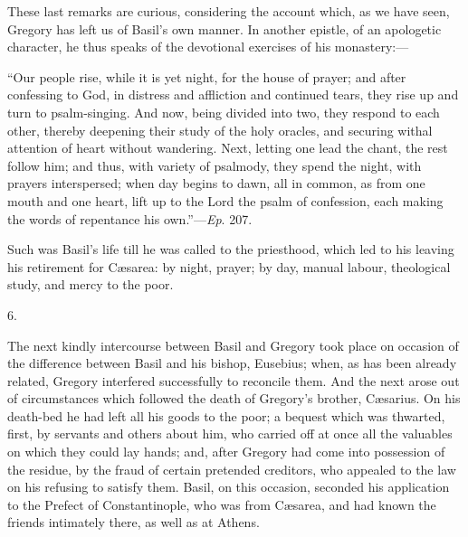 These last remarks are curious, considering the account which, as
we have seen, Gregory has left us of Basil's own manner. In another
epistle, of an apologetic character, he thus speaks of the devotional
exercises of his monastery:—

``Our people rise, while it is yet night, for the house of
prayer; and after confessing to God, in distress and affliction and
continued tears, they rise up and turn to psalm-singing. And now,
being divided into two, they respond to each other, thereby deepening
their study of the holy oracles, and securing withal attention of
heart without wandering. Next, letting one lead the chant, the rest
follow him; and thus, with variety of psalmody, they spend the night,
with prayers interspersed; when day begins to dawn, all in common, as
from one mouth and one heart, lift up to the Lord the psalm of
confession, each making the words of repentance his own.''—\emph{Ep}.
207.

Such was Basil's life till he was called to the priesthood, which
led to his leaving his retirement for Cæsarea: by night, prayer; by
day, manual labour, theological study, and mercy to the poor.

6.

The next kindly intercourse between Basil and Gregory took place on
occasion of the difference between Basil and his bishop, Eusebius;
when, as has been already related, Gregory interfered successfully to
reconcile them. And the next arose out of circumstances which
followed the death of Gregory's brother, Cæsarius. On his death-bed
he had left all his goods to the poor; a bequest which was thwarted,
first, by servants and others about him, who carried off at once all
the valuables on which they could lay hands; and, after Gregory had
come into possession of the residue, by the fraud of certain pretended
creditors, who appealed to the law on his refusing to satisfy them.
Basil, on this occasion, seconded his application to the Prefect of
Constantinople, who was from Cæsarea, and had known the friends
intimately there, as well as at Athens.

